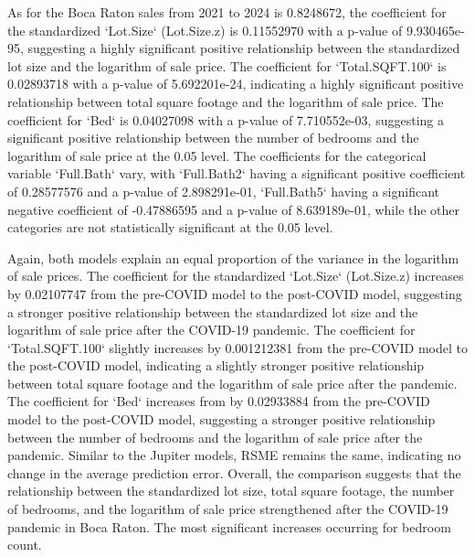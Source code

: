 \documentclass[12pt,english]{article}
\begin{document}
As for the Boca Raton sales from 2021 to 2024 is 0.8248672, the coefficient for the standardized `Lot.Size` (Lot.Size.z) is 0.11552970 with a p-value of 9.930465e-95, suggesting a highly significant positive relationship between the standardized lot size and the logarithm of sale price. The coefficient for `Total.SQFT.100` is 0.02893718 with a p-value of 5.692201e-24, indicating a highly significant positive relationship between total square footage and the logarithm of sale price. The coefficient for `Bed` is 0.04027098 with a p-value of 7.710552e-03, suggesting a significant positive relationship between the number of bedrooms and the logarithm of sale price at the 0.05 level. The coefficients for the categorical variable `Full.Bath` vary, with `Full.Bath2` having a significant positive coefficient of 0.28577576 and a p-value of 2.898291e-01, `Full.Bath5` having a significant negative coefficient of -0.47886595 and a p-value of 8.639189e-01, while the other categories are not statistically significant at the 0.05 level. 

Again, both models explain an equal proportion of the variance in the logarithm of sale prices. The coefficient for the standardized `Lot.Size` (Lot.Size.z) increases by 0.02107747 from the pre-COVID model to the post-COVID model, suggesting a stronger positive relationship between the standardized lot size and the logarithm of sale price after the COVID-19 pandemic. The coefficient for `Total.SQFT.100` slightly increases by 0.001212381 from the pre-COVID model to the post-COVID model, indicating a slightly stronger positive relationship between total square footage and the logarithm of sale price after the pandemic. The coefficient for `Bed` increases from by 0.02933884 from the pre-COVID model to the post-COVID model, suggesting a stronger positive relationship between the number of bedrooms and the logarithm of sale price after the pandemic. Similar to the Jupiter models, RSME remains the same, indicating no change in the average prediction error. Overall, the comparison suggests that the relationship between the standardized lot size, total square footage, the number of bedrooms, and the logarithm of sale price strengthened after the COVID-19 pandemic in Boca Raton. The most significant increases occurring for bedroom count. 
\end{document}
